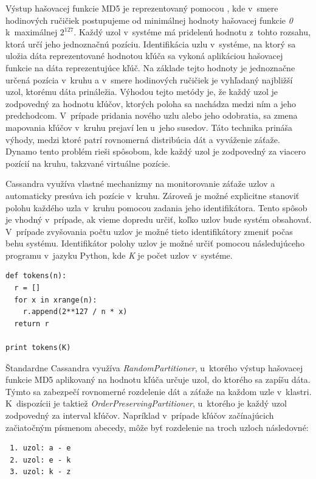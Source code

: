 \documentclass[11pt,twoside,a4paper]{book}
\begin{document}
Výstup hašovacej funkcie MD5 je reprezentovaný pomocou , kde v~smere hodinových ručičiek postupujeme od minimálnej hodnoty hašovacej funkcie \textit{0} k~maximálnej ${2^{127}}$. Každý uzol v~systéme má pridelenú hodnotu z~tohto rozsahu, ktorá určí jeho jednoznačnú pozíciu. Identifikácia uzlu v~systéme, na ktorý sa uložia dáta reprezentované hodnotou kľúča sa vykoná aplikáciou hašovacej funkcie na dáta reprezentujúce kľúč. Na základe tejto hodnoty je jednoznačne určená pozícia v~kruhu a v~smere hodinových ručičiek je vyhľadaný najbližší uzol, ktorému dáta prináležia. Výhodou tejto metódy je, že každý uzol je zodpovedný za hodnotu kľúčov, ktorých poloha sa nachádza medzi ním a jeho predchodcom. V~prípade pridania nového uzlu alebo jeho odobratia, sa zmena mapovania kľúčov v~kruhu prejaví len u~jeho susedov. Táto technika prináša výhody, medzi ktoré patrí rovnomerná distribúcia dát a vyváženie záťaže. Dynamo tento problém rieši spôsobom, kde každý uzol je zodpovedný za viacero pozícií na kruhu, takzvané virtuálne pozície. 

Cassandra využíva vlastné mechanizmy na monitorovanie záťaže uzlov a automaticky presúva ich pozície v~kruhu. Zároveň je možné explicitne stanoviť polohu každého uzla v~kruhu pomocou zadania jeho identifikátora. Tento spôsob je vhodný v~prípade, ak vieme dopredu určiť, koľko uzlov bude systém obsahovať. V~prípade zvyšovania počtu uzlov je možné tieto identifikátory zmeniť počas behu systému. Identifikátor polohy uzlov je možné určiť pomocou následujúceho programu v~jazyku Python, kde \emph{K} je počet uzlov v~systéme.

\begin{verbatim}
def tokens(n):
  r = []
  for x in xrange(n):
    r.append(2**127 / n * x)
  return r

print tokens(K)
\end{verbatim}

Štandardne Cassandra využíva \emph{RandomPartitioner}, u~ktorého výstup hašovacej funkcie MD5 aplikovaný na hodnotu kľúča určuje uzol, do ktorého sa zapíšu dáta. Týmto sa zabezpečí rovnomerné rozdelenie dát a záťaže na každom uzle v~klastri. K~dispozícii je taktiež \emph{OrderPreservingPartitioner}, u~ktorého je každý uzol zodpovedný za interval kľúčov. Napríklad v~prípade kľúčov začínajúcich začiatočným písmenom abecedy, môže byť rozdelenie na troch uzloch následovné:
\begin{verbatim}
 1. uzol: a - e
 2. uzol: e - k
 3. uzol: k - z
\end{verbatim}
\end{document}
